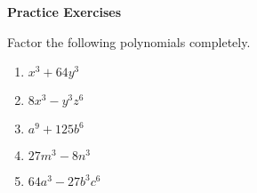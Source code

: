 \textbf{Practice Exercises}

\vspce

Factor the following polynomials completely. 

\begin{enumerate}
\item \hspce $x^{3} + 64y^{3}$
\item \hspce $8x^{3} - y^{3}z^{6}$
\item \hspce $a^{9} + 125b^{6}$
\item \hspce $27m^{3} - 8n^{3}$
\item \hspce $64a^{3} - 27b^{3}c^{6}$
\end{enumerate}